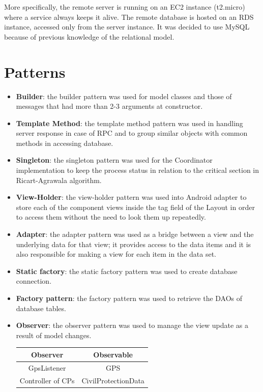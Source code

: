 \documentclass[a4paper,12pt]{report}
\begin{document}
More specifically, the remote server is running on an EC2 instance (t2.micro) where a service always keeps it alive. The remote database is hosted on an RDS instance, accessed only from the server instance. It was decided to use MySQL because of previous knowledge of the relational model.

\section{Patterns}
\begin{itemize}
\item \textbf{Builder}: the builder pattern was used for model classes and those of messages that had more than 2-3 arguments at constructor.
\item \textbf{Template Method}: the template method pattern was used in handling server response in case of RPC and to group similar objects with common methods in accessing database.
\item \textbf{Singleton}: the singleton pattern was used for the Coordinator implementation to keep the process status in relation to the critical section in Ricart-Agrawala algorithm.
\item \textbf{View-Holder}: the view-holder pattern was used into Android adapter to store each of the component views inside the tag field of the Layout in order to access them without the need to look them up repeatedly.
\item \textbf{Adapter}: the adapter pattern was used as a bridge between a view and the underlying data for that view; it provides access to the data items and it is also responsible for making a view for each item in the data set.
\item \textbf{Static factory}: the static factory pattern was used to create database connection.
\item \textbf{Factory pattern}: the factory pattern was used to retrieve the DAOs of database tables.
\item \textbf{Observer}: the observer pattern was used to manage the view update as a result of model changes.

\begin{center}
\begin{tabular}{ |c|c| } 
\hline
Observer 			& Observable \\
\hline
GpsListener 		& GPS \\
Controller of CPs 		& CivilProtectionData\\
\hline
\end{tabular}
\end{center}

\end{itemize}
\end{document}
